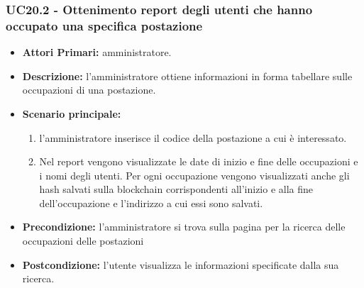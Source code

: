 \subsubsection{ UC20.2 - Ottenimento report degli utenti che hanno occupato una specifica postazione}
\begin{itemize}
	\item\textbf{Attori Primari:} 
	amministratore.
	\item\textbf{Descrizione:} 
	l'amministratore ottiene informazioni in forma tabellare sulle occupazioni di una postazione.
	\item\textbf{Scenario principale:} 
	\begin{enumerate}
		\item l'amministratore inserisce il codice della postazione a cui è interessato.
		\item Nel report vengono visualizzate le date di inizio e fine delle occupazioni e i nomi degli utenti. Per ogni occupazione vengono visualizzati anche gli hash salvati sulla blockchain corrispondenti all'inizio e alla fine dell'occupazione e l'indirizzo a cui essi sono salvati.
	\end{enumerate}
	\item\textbf{Precondizione:} 
	l'amministratore si trova sulla pagina per la ricerca delle occupazioni delle postazioni
	\item\textbf{Postcondizione:}
	l'utente visualizza le informazioni specificate dalla sua ricerca.
\end{itemize}

